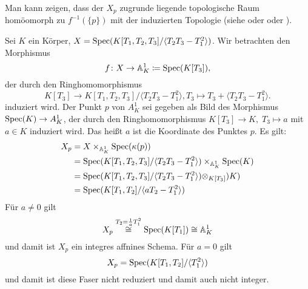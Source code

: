 \begin{bem}
\label{bem:8.7}
	Man kann zeigen, dass der $X_p$ zugrunde liegende topologische Raum homöomorph zu $f^{-1}(\{p\})$ mit der induzierten Topologie (siehe \cite[I.3.4.6]{grothendieck1971elements} oder \cite[Ex.II.3.10]{hartshorne1977algebraic} oder \cite[Prop. 4.20 und (4.8)]{goertz2010algebraic}).
\end{bem}

\begin{bsp}
\label{bsp:8.8}
	Sei $K$ ein Körper, $X=\operatorname{Spec}(K[T_1,T_2,T_3]/\langle T_2T_3 - T_1^2 \rangle)$. Wir betrachten den Morphismus
	\[
		f \colon X \to \mathbb {A}^1_K \coloneqq \operatorname{Spec}(K[T_3]),
	\]
	der durch den Ringhomomorphismus
	\[
		K[T_3] \to K[T_1,T_2,T_3]/\langle T_2T_3 - T_1^2 \rangle, T_3 \mapsto T_3 + \langle T_2T_3 - T_1^2 \rangle.
	\]
	induziert wird. Der Punkt $p$ von $A^1_K$ sei gegeben als Bild des Morphismus $\operatorname{Spec}(K) \to A^1_K$, der durch den Ringhomomorphismus $K[T_3]\to K,\; T_3 \mapsto a$ mit $a \in K$ induziert wird. Das heißt $a$ ist die Koordinate des Punktes $p$. Es gilt:
	\begin{align*}
		X_p &= X \times_{\mathbb {A}^1_K}\operatorname{Spec}(\kappa(p))\\
		&= \operatorname{Spec}(K[T_1,T_2,T_3]/\langle T_2T_3 - T_1^2 \rangle) \times_{\mathbb {A}^1_K}\operatorname{Spec}(K)\\
		&= \operatorname{Spec}(K[T_1,T_2,T_3]/\langle T_2T_3 - T_1^2 \rangle) \otimes_{K[T_3]}) K)\\
		&= \operatorname{Spec}(K[T_1,T_2]/\langle aT_2-T_1^2 \rangle)
	\end{align*}
	Für $a\neq 0$ gilt
	\[
		X_p \overset{T_2= \frac{1}{a}T_1^2}{\cong} \operatorname{Spec}(K[T_1]) \cong \mathbb {A}^1_K
	\]
	und damit ist $X_p$ ein integres affnines Schema. Für $a = 0$ gilt
	\[
		X_p = \operatorname{Spec}(K[T_1,T_2]/ \langle T_1^2 \rangle)
	\]
	und damit ist diese Faser nicht reduziert und damit auch nicht integer.
\end{bsp}